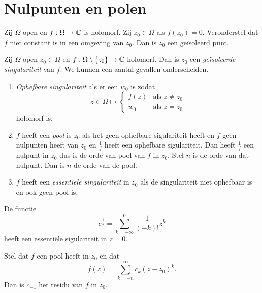 \section{Nulpunten en polen} \label{sec:nulpunten_en_polen}
\begin{herhaling}
Zij $\Omega$ open en $f:\Omega \to \mathbb{C}$ is holomorf. 
Zij $z_0 \in \Omega$ als $f(z_0) = 0$. Veronderstel dat $f$ niet constant is in een omgeving van $z_0$. 
Dan is $z_0$ een ge\"isoleerd punt.	
\end{herhaling}

\begin{definitie}
	Zij $\Omega$ open $z_0 \in \Omega$ en $f: \Omega \setminus \{z_0\} \to \mathbb{C}$ holomorf.
	Dan is $z_0$ een \emph{ge\"isoleerde singulariteit} van $f$. 
	We kunnen een aantal gevallen onderscheiden.
	\begin{enumerate}
		\item \emph{Ophefbare singulariteit} als er een $w_0$ is zodat \[
		z \in \Omega \mapsto  \begin{cases}
			f(z) & \text{als }z \ne z_0 \\
			w_0 & \text{als } z = z_0
		\end{cases}
		\]
		holomorf is.
	\item $f$ heeft een \emph{pool} is $z_0$ als het geen ophefbare sigulariteit heeft en $f$ geen nulpunten heeft van $z_0$ en $\frac{1}{f}$ heeft een ophefbare sigulariteit. 
		Dan heeft $\frac{1}{f}$ een nulpunt in $z_0$ dus is de orde van pool van $f $ in $z_0$. Stel $n$ is de orde van dat nulpunt. Dan is $ n$ de orde van de pool. 

	\item $f$ heeft een \emph{essentiele singulariteit} in $z_0$ als de singulariteit niet ophefbaar is en ook geen pool is.
	\end{enumerate}
\end{definitie}
\begin{vb}
	De functie \[
		e^{\frac{1}{z}} = \sum_{k = -\infty}^{0} \frac{1}{(-k)!}z^{k}	
	\]
	heeft een essenti\"ele sigulariteit in $z =  0$.
\end{vb}


Stel dat $f$ een pool heeft in $z_0$ en dat \[
	f(z) = \sum_{k = -n}^{\infty}c_k (z - z_0)^{k}
.\] 
Dan is $c _{-1}$ het residu van $f$ in $z_0$. 

